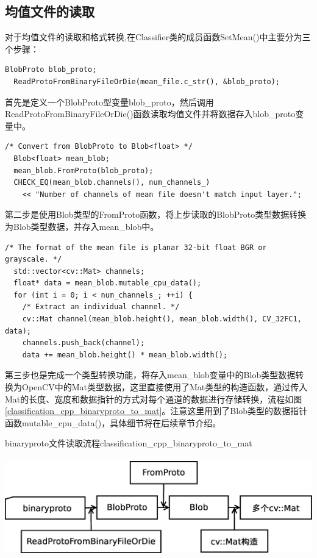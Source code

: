 \subsection{均值文件的读取}
对于均值文件的读取和格式转换,在Classifier类的成员函数SetMean()中主要分为三个步骤：
\begin{verbatim}
BlobProto blob_proto;
  ReadProtoFromBinaryFileOrDie(mean_file.c_str(), &blob_proto);
\end{verbatim}
首先是定义一个BlobProto型变量blob\_proto，然后调用ReadProtoFromBinaryFileOrDie()函数读取均值文件并将数据存入blob\_proto变量中。

\begin{verbatim}
/* Convert from BlobProto to Blob<float> */
  Blob<float> mean_blob;
  mean_blob.FromProto(blob_proto);
  CHECK_EQ(mean_blob.channels(), num_channels_)
    << "Number of channels of mean file doesn't match input layer.";
\end{verbatim}
第二步是使用Blob类型的FromProto函数，将上步读取的BlobProto类型数据转换为Blob类型数据，并存入mean\_blob中。

\begin{verbatim}
/* The format of the mean file is planar 32-bit float BGR or grayscale. */
  std::vector<cv::Mat> channels;
  float* data = mean_blob.mutable_cpu_data();
  for (int i = 0; i < num_channels_; ++i) {
    /* Extract an individual channel. */
    cv::Mat channel(mean_blob.height(), mean_blob.width(), CV_32FC1, data);
    channels.push_back(channel);
    data += mean_blob.height() * mean_blob.width();
\end{verbatim}
第三步也是完成一个类型转换功能，将存入mean\_blob变量中的Blob类型数据转换为OpenCV中的Mat类型数据，这里直接使用了Mat类型的构造函数，通过传入Mat的长度、宽度和数据指针的方式对每个通道的数据进行存储转换，流程如图\ref{classification_cpp_binaryproto_to_mat}。注意这里用到了Blob类型的数据指针函数mutable\_cpu\_data()，具体细节将在后续章节介绍。
\begin{cnfigure}{binaryproto文件读取流程}{classification_cpp_binaryproto_to_mat}
\includegraphics[height=5cm ,width=15cm,angle=0]{include/chp_from_examples/figures/classification_cpp_binaryproto_to_mat.eps}
\end{cnfigure}

